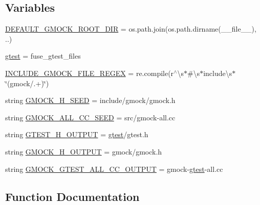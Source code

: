 \subsection*{Variables}
\begin{DoxyCompactItemize}
\item 
\hyperlink{namespacefuse__gmock__files_a900b64b34e20c7430b72252192a3c7ed}{D\+E\+F\+A\+U\+L\+T\+\_\+\+G\+M\+O\+C\+K\+\_\+\+R\+O\+O\+T\+\_\+\+D\+IR} = os.\+path.\+join(os.\+path.\+dirname(\+\_\+\+\_\+file\+\_\+\+\_\+), \textquotesingle{}..\textquotesingle{})
\item 
\hyperlink{namespacefuse__gmock__files_a3fb36dbe8d361f9ecc54e1aa4b94b068}{gtest} = fuse\+\_\+gtest\+\_\+files
\item 
\hyperlink{namespacefuse__gmock__files_aeb4457451f878d6bc8a42f7ff3e5f6cf}{I\+N\+C\+L\+U\+D\+E\+\_\+\+G\+M\+O\+C\+K\+\_\+\+F\+I\+L\+E\+\_\+\+R\+E\+G\+EX} = re.\+compile(r\textquotesingle{}$^\wedge$\textbackslash{}s$\ast$\#\textbackslash{}s$\ast$include\textbackslash{}s$\ast$\char`\"{}(gmock/.+)\char`\"{}\textquotesingle{})
\item 
string \hyperlink{namespacefuse__gmock__files_aa31b816a9048fb3fa9d482eeac69c139}{G\+M\+O\+C\+K\+\_\+\+H\+\_\+\+S\+E\+ED} = \textquotesingle{}include/gmock/gmock.\+h\textquotesingle{}
\item 
string \hyperlink{namespacefuse__gmock__files_a518e1f3cc3f184747e6ed3f2d0233c99}{G\+M\+O\+C\+K\+\_\+\+A\+L\+L\+\_\+\+C\+C\+\_\+\+S\+E\+ED} = \textquotesingle{}src/gmock-\/all.\+cc\textquotesingle{}
\item 
string \hyperlink{namespacefuse__gmock__files_a385c31d8542b0a2e4b7f46cb2a32d7da}{G\+T\+E\+S\+T\+\_\+\+H\+\_\+\+O\+U\+T\+P\+UT} = \textquotesingle{}\hyperlink{namespacefuse__gmock__files_a3fb36dbe8d361f9ecc54e1aa4b94b068}{gtest}/gtest.\+h\textquotesingle{}
\item 
string \hyperlink{namespacefuse__gmock__files_aba0664abeb60f34cfdf59e8475a465d0}{G\+M\+O\+C\+K\+\_\+\+H\+\_\+\+O\+U\+T\+P\+UT} = \textquotesingle{}gmock/gmock.\+h\textquotesingle{}
\item 
string \hyperlink{namespacefuse__gmock__files_a9759f3f6c404e3292c26c9317792e846}{G\+M\+O\+C\+K\+\_\+\+G\+T\+E\+S\+T\+\_\+\+A\+L\+L\+\_\+\+C\+C\+\_\+\+O\+U\+T\+P\+UT} = \textquotesingle{}gmock-\/\hyperlink{namespacefuse__gmock__files_a3fb36dbe8d361f9ecc54e1aa4b94b068}{gtest}-\/all.\+cc\textquotesingle{}
\end{DoxyCompactItemize}


\subsection{Function Documentation}
\mbox{\label{namespacefuse__gmock__files_ae76b6bc18373325fc3f002abf5c4378f}} 
